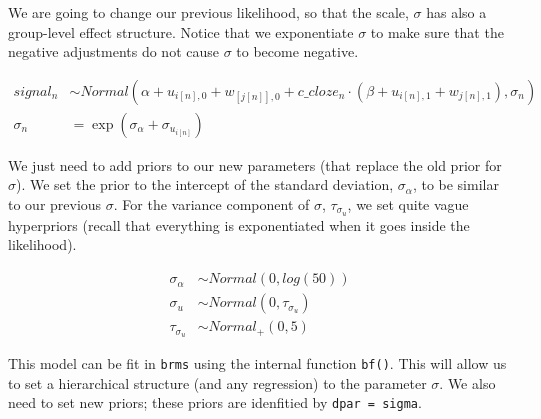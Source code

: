 \documentclass[12pt,]{krantz}
\theoremstyle{definition}
\theoremstyle{definition}
\theoremstyle{definition}
\theoremstyle{remark}
\begin{document}
We are going to change our previous likelihood, so that the scale, \(\sigma\) has also a group-level effect structure. Notice that we exponentiate \(\sigma\) to make sure that the negative adjustments do not cause \(\sigma\) to become negative.

\begin{equation}
\begin{aligned}
  signal_n &\sim Normal(\alpha + u_{i[n],0} + w_{[j[n]],0} + c\_cloze_n \cdot  (\beta + u_{i[n],1}+ w_{j[n],1}), \sigma_n)\\
  \sigma_n &= \exp(\sigma_\alpha + \sigma_{u_{i[n]}})
\end{aligned}
\end{equation}

We just need to add priors to our new parameters (that replace the old prior for \(\sigma\)). We set the prior to the intercept of the standard deviation, \(\sigma_\alpha\), to be similar to our previous \(\sigma\). For the variance component of \(\sigma\), \(\tau_{\sigma_u}\), we set quite vague hyperpriors (recall that everything is exponentiated when it goes inside the likelihood).

\begin{equation}
\begin{aligned}
  \sigma_\alpha &\sim Normal(0,log(50))\\
  \sigma_u &\sim Normal(0, \tau_{\sigma_u}) \\
  \tau_{\sigma_u} &\sim Normal_+(0, 5)
\end{aligned}
\end{equation}

This model can be fit in \texttt{brms} using the internal function \texttt{bf()}. This will allow us to set a hierarchical structure (and any regression) to the parameter \(\sigma\). We also need to set new priors; these priors are idenfitied by \texttt{dpar\ =\ sigma}.
\end{document}
